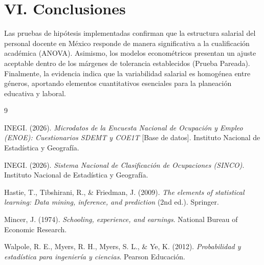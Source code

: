 \documentclass[10pt,twocolumn,a4paper]{article}
\begin{document}
\section{VI. Conclusiones}
Las pruebas de hipótesis implementadas confirman que la estructura salarial del personal docente en México responde de manera significativa a la cualificación académica (ANOVA). Asimismo, los modelos econométricos presentan un ajuste aceptable dentro de los márgenes de tolerancia establecidos (Prueba Pareada). Finalmente, la evidencia indica que la variabilidad salarial es homogénea entre géneros, aportando elementos cuantitativos esenciales para la planeación educativa y laboral.

\begin{thebibliography}{9}

INEGI. (2026). \emph{Microdatos de la Encuesta Nacional de Ocupación y Empleo (ENOE): Cuestionarios SDEMT y COE1T} [Base de datos]. Instituto Nacional de Estadística y Geografía.

INEGI. (2026). \emph{Sistema Nacional de Clasificación de Ocupaciones (SINCO)}. Instituto Nacional de Estadística y Geografía.

Hastie, T., Tibshirani, R., \& Friedman, J. (2009). \emph{The elements of statistical learning: Data mining, inference, and prediction} (2nd ed.). Springer.

Mincer, J. (1974). \emph{Schooling, experience, and earnings}. National Bureau of Economic Research.

Walpole, R. E., Myers, R. H., Myers, S. L., \& Ye, K. (2012). \emph{Probabilidad y estadística para ingeniería y ciencias}. Pearson Educación.
\end{thebibliography}
\end{document}
